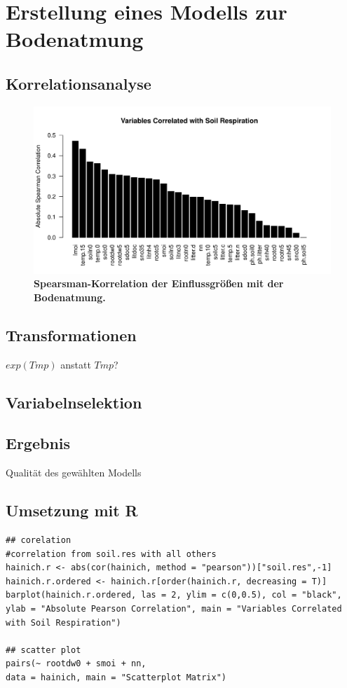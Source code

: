 \section{Erstellung eines Modells zur Bodenatmung}
\label{sec-model}

\subsection{Korrelationsanalyse}

\begin{figure}
	\centering
	\includegraphics[width=\textwidth]{fig/model/spearsman-cor.pdf}
	\caption{\bf{Spearsman-Korrelation} der Einflussgrößen mit der Bodenatmung.}
\end{figure}

\subsection{Transformationen}
$exp(Tmp)$ anstatt $Tmp$?

\subsection{Variabelnselektion}

\subsection{Ergebnis}
Qualität des gewählten Modells

\subsection{Umsetzung mit R}

\begin{lstlisting}
## corelation
#correlation from soil.res with all others
hainich.r <- abs(cor(hainich, method = "pearson"))["soil.res",-1]
hainich.r.ordered <- hainich.r[order(hainich.r, decreasing = T)]
barplot(hainich.r.ordered, las = 2, ylim = c(0,0.5), col = "black", 
ylab = "Absolute Pearson Correlation", main = "Variables Correlated with Soil Respiration")

## scatter plot
pairs(~ rootdw0 + smoi + nn,
data = hainich, main = "Scatterplot Matrix")
\end{lstlisting}